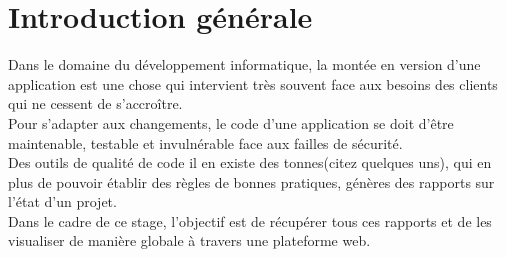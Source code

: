 \chapter*{Introduction générale}
Dans le domaine du développement informatique, la montée en version d'une application est une chose qui intervient très souvent face aux besoins des clients qui ne cessent de s'accroître.\\
Pour s'adapter aux changements, le code d'une application se doit d'être maintenable, testable et invulnérable face aux failles de sécurité.\\
Des outils de qualité de code il en existe des tonnes(citez quelques uns), qui en plus de pouvoir établir des règles de bonnes pratiques, génères des rapports sur l'état d'un projet.\\
Dans le cadre de ce stage, l'objectif est de récupérer tous ces rapports et de les visualiser de manière globale à travers une plateforme web.